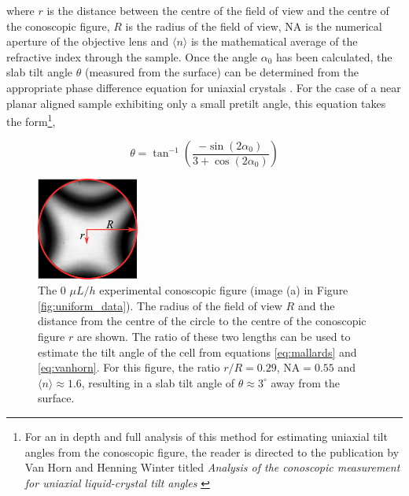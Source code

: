 \noindent where $r$ is the distance between the centre of the field of view and the centre of the conoscopic figure, $R$ is the radius of the field of view, NA is the numerical aperture of the objective lens and $\langle n\rangle$ is the mathematical average of the refractive index through the sample. Once the angle $\alpha_0$ has been calculated, the slab tilt angle $\theta$ (measured from the surface) can be determined from the appropriate phase difference equation for uniaxial crystals \cite{Horn2001}. For the case of a near planar aligned sample exhibiting only a small pretilt angle, this equation takes the form\footnote{For an in depth and full analysis of this method for estimating uniaxial tilt angles from the conoscopic figure, the reader is directed to the publication by Van Horn and Henning Winter titled \textit{Analysis of the conoscopic measurement for uniaxial liquid-crystal tilt angles} \cite{Horn2001}},

\begin{equation}
\label{eq:vanhorn}
\theta=\tan^{-1}\left(\frac{-\sin\left(2\alpha_0\right)}{3+\cos\left(2\alpha_0\right)}\right)
\end{equation}

\begin{figure}
\begin{center}
\includegraphics[width=0.3\textwidth]{Figures/90/calculate_tilt_pdf}
\end{center}
\caption[Estimation of the uniform tilt angle from the conoscopic figure]{\label{fig:calculate_tilt}The 0 $\mu L/h$ experimental conoscopic figure (image (a) in Figure \ref{fig:uniform_data}). The radius of the field of view $R$ and the distance from the centre of the circle to the centre of the conoscopic figure $r$ are shown. The ratio of these two lengths can be used to estimate the tilt angle of the cell from equations \ref{eq:mallards} and \ref{eq:vanhorn}. For this figure, the ratio $r/R=0.29$, $\text{NA}=0.55$ and $\langle n\rangle\approx1.6$, resulting in a slab tilt angle of $\theta\approx3^{\circ}$ away from the surface.}
\end{figure}

